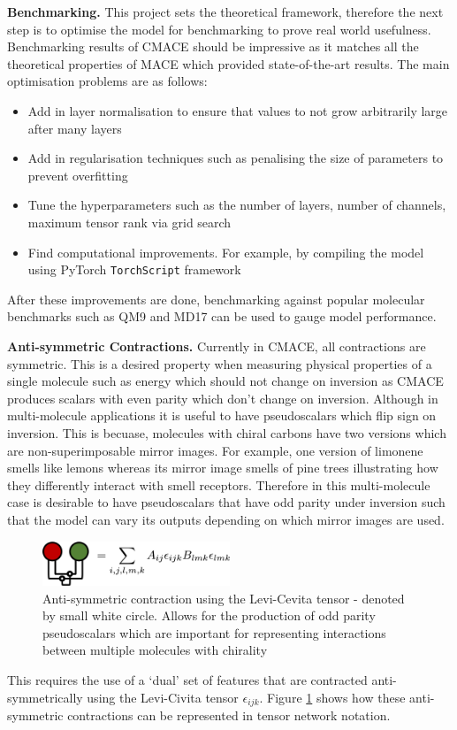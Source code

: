 \textbf{Benchmarking. } This project sets the theoretical framework, therefore the next step is to optimise the model for benchmarking to prove real world usefulness. Benchmarking results of CMACE should be impressive as it matches all the theoretical properties of MACE which provided state-of-the-art results. The main optimisation problems are as follows:

\begin{itemize}
    \item Add in layer normalisation to ensure that values to not grow arbitrarily large after many layers
    \item Add in regularisation techniques such as penalising the size of parameters to prevent overfitting
    \item Tune the hyperparameters such as the number of layers, number of channels, maximum tensor rank via grid search
    \item Find computational improvements. For example, by compiling the model using PyTorch \texttt{TorchScript} framework 
\end{itemize}

After these improvements are done, benchmarking against popular molecular benchmarks such as QM9 and MD17 can be used to gauge model performance. 

\textbf{Anti-symmetric Contractions. } Currently in CMACE, all contractions are symmetric. This is a desired property when measuring physical properties of a single molecule such as energy which should not change on inversion as CMACE produces scalars with even parity which don't change on inversion. Although in multi-molecule applications it is useful to have pseudoscalars which flip sign on inversion. This is becuase, molecules with chiral carbons have two versions which are non-superimposable mirror images. For example, one version of limonene smells like lemons whereas its mirror image smells of pine trees illustrating how they differently interact with smell receptors. Therefore in this multi-molecule case is desirable to have pseudoscalars that have odd parity under inversion such that the model can vary its outputs depending on which mirror images are used. 

\begin{figure}[H]
    \centering
    \includegraphics[width=0.5\textwidth]{figures/anti-sym.png}
    \caption{Anti-symmetric contraction using the Levi-Cevita tensor - denoted by small white circle. Allows for the production of odd parity pseudoscalars which are important for representing interactions between multiple molecules with chirality}
    \label{fig:anti-sym}
\end{figure}

This requires the use of a `dual' set of features that are contracted anti-symmetrically using the Levi-Civita tensor $\epsilon_{ijk}$. Figure \ref{fig:anti-sym} shows how these anti-symmetric contractions can be represented in tensor network notation. 




